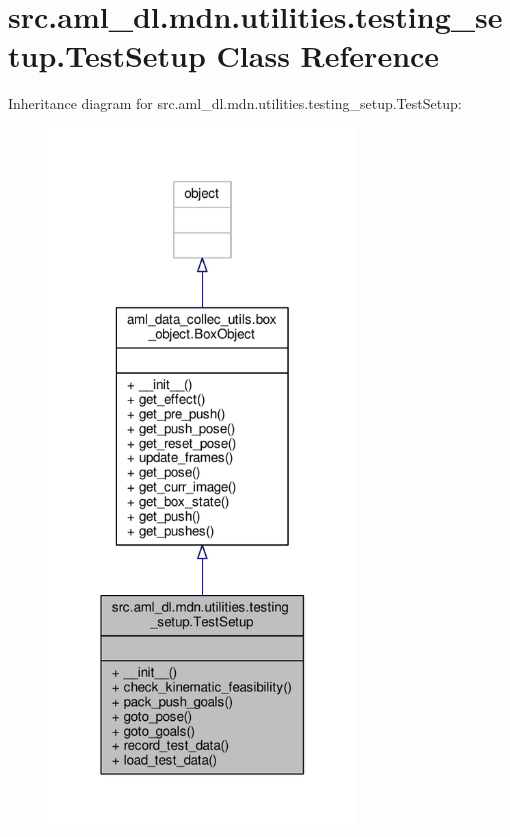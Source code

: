 \hypertarget{classsrc_1_1aml__dl_1_1mdn_1_1utilities_1_1testing__setup_1_1_test_setup}{\section{src.\-aml\-\_\-dl.\-mdn.\-utilities.\-testing\-\_\-setup.\-Test\-Setup Class Reference}
\label{classsrc_1_1aml__dl_1_1mdn_1_1utilities_1_1testing__setup_1_1_test_setup}
}


Inheritance diagram for src.\-aml\-\_\-dl.\-mdn.\-utilities.\-testing\-\_\-setup.\-Test\-Setup\-:
\nopagebreak
\begin{figure}[H]
\begin{center}
\leavevmode
\includegraphics[width=232pt]{classsrc_1_1aml__dl_1_1mdn_1_1utilities_1_1testing__setup_1_1_test_setup__inherit__graph}
\end{center}
\end{figure}


